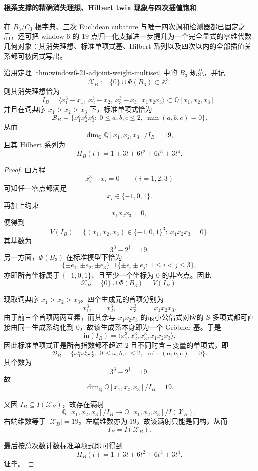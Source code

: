 \paragraph{根系支撑的精确消失理想、Hilbert twin 现象与四次插值饱和}
在 \(B_3/C_3\) 根字典、三次 Euclidean cubature 与唯一四次调和检测器都已固定之后，还可把 window-\(6\) 的 \(19\) 点归一化支撑进一步提升为一个完全显式的零维代数几何对象：其消失理想、标准单项式基、Hilbert 系列以及四次以内的全部插值关系都可被闭式写出。

\begin{theorem}\label{thm:window6-b3-support-vanishing-ideal-hilbert}
沿用定理 \ref{thm:window6-21-adjoint-weight-multiset} 中的 \(B_3\) 规范，并记
\[
\mathscr X_B:=\{0\}\cup \Phi(B_3)\subset \mathbb A^3.
\]
则其消失理想恰为
\[
I_B=
\bigl\langle
x_1^3-x_1,\ x_2^3-x_2,\ x_3^3-x_3,\ x_1x_2x_3
\bigr\rangle
\subset \mathbb Q[x_1,x_2,x_3].
\]
并且在词典序 \(x_1>x_2>x_3\) 下，标准单项式恰为
\[
\mathcal B_B=
\bigl\{
x_1^a x_2^b x_3^c:\ 0\le a,b,c\le 2,\ \min(a,b,c)=0
\bigr\}.
\]
从而
\[
\dim_{\mathbb Q}\mathbb Q[x_1,x_2,x_3]/I_B=19,
\]
且其 Hilbert 系列为
\[
\boxed{\;
H_B(t)=1+3t+6t^2+6t^3+3t^4.\;}
\]
\end{theorem}
\begin{proof}
由方程
\[
x_i^3-x_i=0
\qquad (i=1,2,3)
\]
可知任一零点都满足
\[
x_i\in\{-1,0,1\}.
\]
再加上约束
\[
x_1x_2x_3=0,
\]
便得到
\[
V(I_B)
=
\bigl\{
(x_1,x_2,x_3)\in\{-1,0,1\}^3:\ x_1x_2x_3=0
\bigr\}.
\]
其基数为
\[
3^3-2^3=19.
\]
另一方面，\(\Phi(B_3)\) 在标准模型下恰为
\[
\{\pm e_1,\pm e_2,\pm e_3\}
\sqcup
\{\pm e_i\pm e_j:\ 1\le i<j\le 3\},
\]
亦即所有坐标属于 \(\{-1,0,1\}\)、且至少一个坐标为 \(0\) 的非零点。因此
\[
\mathscr X_B=\{0\}\cup \Phi(B_3)=V(I_B).
\]

现取词典序 \(x_1>x_2>x_3\)。四个生成元的首项分别为
\[
x_1^3,\qquad x_2^3,\qquad x_3^3,\qquad x_1x_2x_3.
\]
由于前三个首项两两互素，而其余与 \(x_1x_2x_3\) 的最小公倍式对应的 \(S\)-多项式都可直接由同一生成系约化到 \(0\)，故该生成系本身即为一个 Gröbner 基。于是
\[
\mathrm{in}(I_B)=\langle x_1^3,x_2^3,x_3^3,x_1x_2x_3\rangle.
\]
因此标准单项式正是所有指数都不超过 \(2\) 且不同时含三变量的单项式，即
\[
\mathcal B_B=
\bigl\{
x_1^a x_2^b x_3^c:\ 0\le a,b,c\le 2,\ \min(a,b,c)=0
\bigr\}.
\]
其个数为
\[
3^3-2^3=19.
\]
故
\[
\dim_{\mathbb Q}\mathbb Q[x_1,x_2,x_3]/I_B=19.
\]

又因 \(I_B\subseteq I(\mathscr X_B)\)，故存在满射
\[
\mathbb Q[x_1,x_2,x_3]/I_B\twoheadrightarrow \mathbb Q[x_1,x_2,x_3]/I(\mathscr X_B),
\]
右端维数等于 \(|\mathscr X_B|=19\)。左端维数亦为 \(19\)，故该满射只能是同构，从而
\[
I_B=I(\mathscr X_B).
\]

最后按总次数计数标准单项式即可得到
\[
H_B(t)=1+3t+6t^2+6t^3+3t^4.
\]
证毕。
\end{proof}


